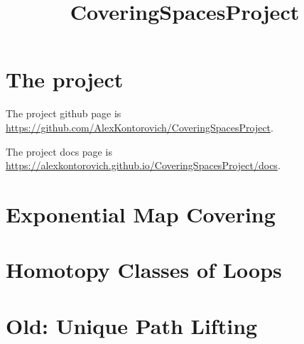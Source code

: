 \usepackage{amsmath, amsthm}
\usepackage{hyperref}

\theoremstyle{definition}
\newtheorem{definition}{Definition}
\newtheorem{theorem}{Theorem}
\newtheorem{proposition}{Proposition}
\newtheorem{lemma}{Lemma}
\newtheorem{corollary}{Corollary}

\title{CoveringSpacesProject}

\newcommand{\eps}{\epsilon}

\newcommand{\R}{\mathbb{R}}
\newcommand{\Q}{\mathbb{Q}}
\newcommand{\C}{\mathbb{C}}
\newcommand{\Z}{\mathbb{Z}}
\newcommand{\N}{\mathbb{N}}



\maketitle

\chapter{The project}

The project github page is \url{https://github.com/AlexKontorovich/CoveringSpacesProject}.

The project docs page is \url{https://alexkontorovich.github.io/CoveringSpacesProject/docs}.

\chapter{Exponential Map Covering}


\chapter{Homotopy Classes of Loops}


\chapter{Old: Unique Path Lifting}


%
%


